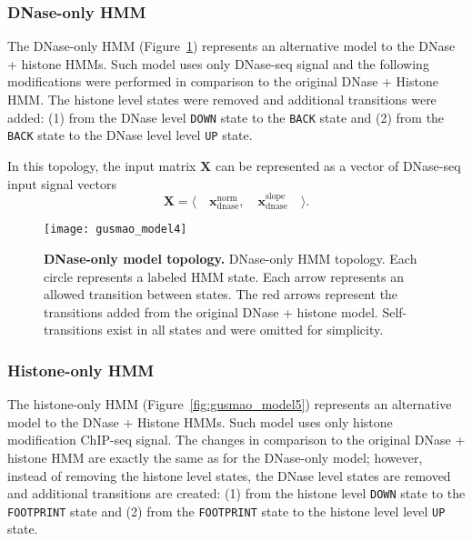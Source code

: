 \subsubsection{DNase-only HMM}

The DNase-only HMM (Figure~\ref{fig:gusmao_model4}) represents an alternative model to the DNase + histone HMMs. Such model uses only DNase-seq signal and the following modifications were performed in comparison to the original DNase + Histone HMM. The histone level states were removed and additional transitions were added: (1) from the DNase level {\tt DOWN} state to the {\tt BACK} state and (2) from the {\tt BACK} state to the DNase level level {\tt UP} state.

In this topology, the input matrix $\mathbf{X}$ can be represented as a vector of DNase-seq input signal vectors
\begin{equation}
  \label{eq:signal.m4}
  \mathbf{X} = \langle \quad \mathbf{x}^{\text{norm}}_{\text{dnase}} ,\quad \mathbf{x}^{\text{slope}}_{\text{dnase}} \quad \rangle .
\end{equation}

\begin{figure}[h!]
\centering
\texttt{[image: gusmao\_model4]}
\caption[DNase-only model topology]{\textbf{DNase-only model topology.} DNase-only HMM topology. Each circle represents a labeled HMM state. Each arrow represents an allowed transition between states. The red arrows represent the transitions added from the original DNase + histone model. Self-transitions exist in all states and were omitted for simplicity.}
\label{fig:gusmao_model4}
\end{figure}

\subsubsection{Histone-only HMM}

The histone-only HMM (Figure~\ref{fig:gusmao_model5}) represents an alternative model to the DNase + Histone HMMs. Such model uses only histone modification ChIP-seq signal. The changes in comparison to the original DNase + histone HMM are exactly the same as for the DNase-only model; however, instead of removing the histone level states, the DNase level states are removed and additional transitions are created: (1) from the histone level {\tt DOWN} state to the {\tt FOOTPRINT} state and (2) from the {\tt FOOTPRINT} state to the histone level level {\tt UP} state.

